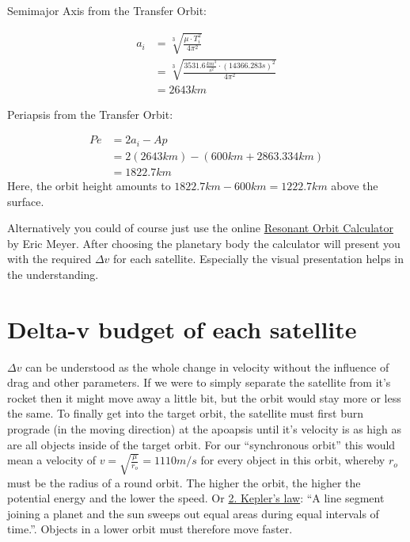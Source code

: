 \documentclass[12pt,paper=A4,numbers=noenddot,bibliography=totoc,listof=totoc,DIV=11,BCOR=1mm]{scrreprt}
\begin{document}
\begin{flushleft}
Semimajor Axis from the Transfer Orbit:
\end{flushleft}
\begin{equation}
\begin{split}
a_{i} &= \sqrt[3]{\frac{\mu \cdot T_{i}^{2}}{4\pi^{2}}} \\
   &= \sqrt[3]{\frac{3531.6 \frac{km^{3}}{s^{2}} \cdot (14366.283s)^{2}}{4\pi^{2}}} \\
   &= 2643km
\end{split}
\end{equation}

\begin{flushleft}
Periapsis from the Transfer Orbit:
\end{flushleft}
\begin{equation}
\begin{split}
Pe &= 2a_{i} - Ap \\
   &= 2(2643km) - (600km + 2863.334km) \\
   &= 1822.7km
\end{split} 
\end{equation}
Here, the orbit height amounts to $1822.7km - 600km = 1222.7km$ above the surface.

\bigskip
Alternatively you could of course just use the online \href{https://meyerweb.com/eric/ksp/resonant-orbits/}{Resonant Orbit Calculator} by Eric Meyer. After choosing the planetary body the calculator will present you with the required $\Delta v$ for each satellite. Especially the visual presentation helps in the understanding.

\section{Delta-v budget of each satellite}
$\Delta v$ can be understood as the whole change in velocity without the influence of drag and other parameters. If we were to simply separate the satellite from it's rocket then it might move away a little bit, but the orbit would stay more or less the same. To finally get into the target orbit, the satellite must first burn prograde (in the moving direction) at the apoapsis until it's velocity is as high as are all objects inside of the target orbit. For our ``synchronous orbit'' this would mean a velocity of $v = \sqrt{\frac{\mu}{r_{o}}} = 1110m/s$ for every object in this orbit, whereby $r_{o}$ must be the radius of a round orbit. The higher the orbit, the higher the potential energy and the lower the speed. Or \href{https://en.wikipedia.org/wiki/Kepler%27s_laws_of_planetary_motion}{2. Kepler's law}: ``A line segment joining a planet and the sun sweeps out equal areas during equal intervals of time.''. Objects in a lower orbit must therefore move faster.\\
\end{document}
